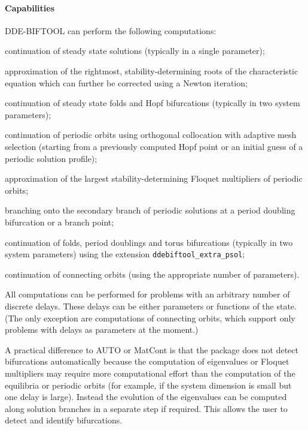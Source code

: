 \documentclass[10pt]{scrartcl}
\newcommand{\DDEBIFCODE}{\textsc{DDE-BIFTOOL}}
\newcommand{\ddebifweb}{\url{http://twr.cs.kuleuven.be/research/software/delay/ddebiftool.shtml}}
\begin{document}
\paragraph{Capabilities}
{\DDEBIFCODE} can perform the following computations:
\begin{compactitem}
\item continuation of steady state solutions (typically in a single
  parameter);
\item approximation of the rightmost, stability-determining roots of
  the characteristic equation which can further be corrected using a
  Newton iteration;
\item continuation of steady state folds and Hopf bifurcations
  (typically in two system parameters);
\item continuation of periodic orbits using orthogonal collocation
  with adaptive mesh selection (starting from a previously computed
  Hopf point or an initial guess of a periodic solution profile);
\item approximation of the largest stability-determining Floquet
  multipliers of periodic orbits;
\item branching onto the secondary branch of periodic solutions at a
  period doubling bifurcation or a branch point;
\item continuation of folds, period doublings and torus bifurcations
  (typically in two system parameters) using the extension
  \texttt{ddebiftool\_extra\_psol};
\item continuation of connecting orbits (using the appropriate number
  of parameters).  
\end{compactitem}
All computations can be performed for problems with an arbitrary
number of discrete delays. These delays can be either parameters or
functions of the state.
(The only exception are computations of connecting orbits, which
support only problems with delays as parameters at the moment.)

A practical difference to AUTO or MatCont is that the package does not detect
bifurcations automatically because the computation of eigenvalues or
Floquet multipliers may require more computational effort than the
computation of the equilibria or periodic orbits (for example, if the
system dimension is small but one delay is large). Instead the
evolution of the eigenvalues can be computed along solution branches
in a separate step if required. This allows the user to detect and
identify bifurcations.

\end{document}
